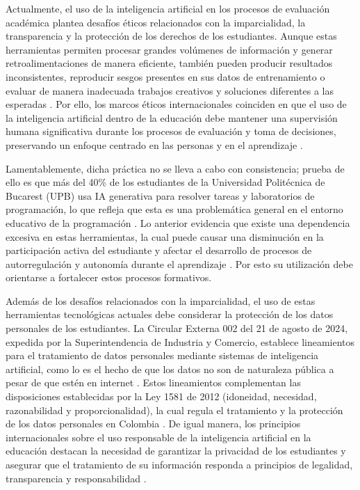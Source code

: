 \documentclass[letterpaper, 10 pt, conference]{ieeeconf}
\begin{document}
Actualmente, el uso de la inteligencia artificial en los procesos de evaluación académica plantea desafíos éticos relacionados con la imparcialidad, la transparencia y la protección de los derechos de los estudiantes. Aunque estas herramientas permiten procesar grandes volúmenes de información y generar retroalimentaciones de manera eficiente, también pueden producir resultados inconsistentes, reproducir sesgos presentes en sus datos de entrenamiento o evaluar de manera inadecuada trabajos creativos y soluciones diferentes a las esperadas \cite{8}. Por ello, los marcos éticos internacionales coinciden en que el uso de la inteligencia artificial dentro de la educación debe mantener una supervisión humana significativa durante los procesos de evaluación y toma de decisiones, preservando un enfoque centrado en las personas y en el aprendizaje \cite{4}.

Lamentablemente, dicha práctica no se lleva a cabo con consistencia; prueba de ello es que más del 40\% de los estudiantes de la Universidad Politécnica de Bucarest (UPB) usa IA generativa para resolver tareas y laboratorios de programación, lo que refleja que esta es una problemática general en el entorno educativo de la programación \cite{22}. Lo anterior evidencia que existe una dependencia excesiva en estas herramientas, la cual puede causar una disminución en la participación activa del estudiante y afectar el desarrollo de procesos de autorregulación y autonomía durante el aprendizaje \cite{4}. Por esto su utilización debe orientarse a fortalecer estos procesos formativos.

Además de los desafíos relacionados con la imparcialidad, el uso de estas herramientas tecnológicas actuales debe considerar la protección de los datos personales de los estudiantes. La Circular Externa 002 del 21 de agosto de 2024, expedida por la Superintendencia de Industria y Comercio, establece lineamientos para el tratamiento de datos personales mediante sistemas de inteligencia artificial, como lo es el hecho de que los datos no son de naturaleza pública a pesar de que estén en internet \cite{2}. Estos lineamientos complementan las disposiciones establecidas por la Ley 1581 de 2012 (idoneidad, necesidad, razonabilidad y proporcionalidad), la cual regula el tratamiento y la protección de los datos personales en Colombia \cite{3}. De igual manera, los principios internacionales sobre el uso responsable de la inteligencia artificial en la educación destacan la necesidad de garantizar la privacidad de los estudiantes y asegurar que el tratamiento de su información responda a principios de legalidad, transparencia y responsabilidad \cite{14}. 
\end{document}
